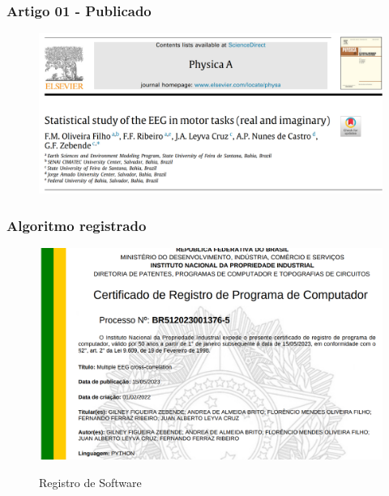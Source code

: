 \documentclass[11pt, aspectratio=169]{beamer}
\begin{document}
\begin{frame}
  \frametitle{Artigo 01 - Publicado}

  \begin{figure}[!htb]
    \centering
    \caption{\cite{Oliveira2023}}
    \includegraphics[height=.6\paperheight]{../Figures/artigos_publicados/artigo_01_abr_2023.png}
    \label{fig:ar_pub_01}
  \end{figure}

\end{frame}


\begin{frame}
  \frametitle{Algoritmo registrado}

  \begin{figure}[!htb]
    \centering
    \caption{Registro de Software}
    \includegraphics[height=.6\paperheight]{../Figures/artigos_publicados/certificado_alg_01.png}
    \label{fig:alg_pub_01}
  \end{figure}

\end{frame}
\end{document}
